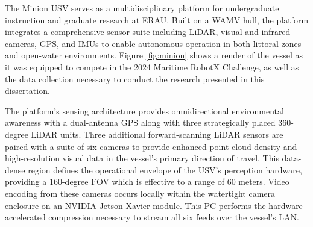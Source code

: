 \documentclass{erauthesis}
\begin{document}

The Minion \ac{USV} serves as a multidisciplinary platform for undergraduate instruction and graduate research at \ac{ERAU}.
Built on a \ac{WAMV} hull, the platform integrates a comprehensive sensor suite including \ac{LiDAR}, visual and infrared cameras, \ac{GPS}, and \acp{IMU} to enable autonomous operation in both littoral zones and open-water environments.
Figure \ref{fig:minion} shows a render of the vessel as it was equipped to compete in the 2024 Maritime RobotX Challenge, as well as the data collection necessary to conduct the research presented in this dissertation.

The platform's sensing architecture provides omnidirectional environmental awareness with a dual-antenna \ac{GPS} along with three strategically placed 360-degree \ac{LiDAR} units.
Three additional forward-scanning \ac{LiDAR} sensors are paired with a suite of six cameras to provide enhanced point cloud density and high-resolution visual data in the vessel's primary direction of travel. 
This data-dense region defines the operational envelope of the \ac{USV}'s perception hardware, providing a 160-degree \acl{FOV} which is effective to a range of 60 meters.
Video encoding from these cameras occurs locally within the watertight camera enclosure on an NVIDIA Jetson Xavier module.
This PC performs the hardware-accelerated compression necessary to stream all six feeds over the vessel's \ac{LAN}.
\end{document}
